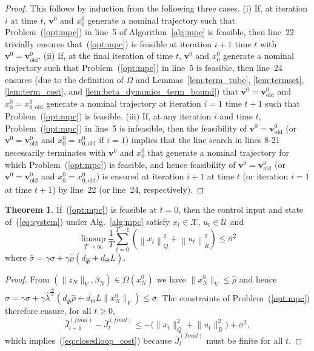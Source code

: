 \documentclass{IEEEtran}
\theoremstyle{definition}
\newtheorem{theorem}{Theorem}
\theoremstyle{remark}
\def\iter{i}
\begin{document}
\begin{proof}
This follows by induction from the following three cases. 
(i) If, at  iteration $\iter$ at time $t$, $\mathbf{v}^0$ and $x^0_0$ generate a nominal trajectory such that Problem~(\ref{opt:mpc}) in line~5 of Algorithm~\ref{alg:mpc} is feasible, then line~22 trivially ensures that~(\ref{opt:mpc}) is feasible at iteration $i+1$ time $t$ with $\mathbf{v}^0 = \mathbf{v}^0_{\mathrm{old}}$.
%
(ii) If, at the final iteration of time $t$, $\mathbf{v}^0$ and $x^0_0$ generate a nominal trajectory such that Problem~(\ref{opt:mpc}) in line~5 is feasible, then line~24 ensures 
(due to the definition of $\Omega$ and 
Lemmas~\ref{lem:term_tube}, \ref{lem:termset}, \ref{lem:term_cost}, and \ref{lem:beta_dynamics_term_bound})
that $\mathbf{v}^0=\mathbf{v}^0_{\mathrm{old}}$ and $x^0_0 = x^0_{0,\mathrm{old}}$ 
generate a nominal trajectory at iteration $i=1$ time $t+1$ such that Problem~(\ref{opt:mpc}) is feasible.
%
(iii) If, at any iteration $\iter$ and time $t$, Problem~(\ref{opt:mpc}) in line~5 is infeasible, then the feasibility of $\mathbf{v}^0 =\mathbf{v}^0_{\mathrm{old}}$ (or $\mathbf{v}^0 =\mathbf{v}^0_{\mathrm{old}}$ and $x^0_0=x^0_{0,\mathrm{old}}$ if $i=1$) implies that the line search in lines 8-21 necessarily terminates with $\mathbf{v}^0$ and $x^0_0$ that generate a nominal trajectory for which Problem~(\ref{opt:mpc}) is feasible, and hence feasibility of $\mathbf{v}^0 = \mathbf{v}^0_{\mathrm{old}}$ (or $\mathbf{v}^0 =\mathbf{v}^0_{\mathrm{old}}$ and $x^0_0=x^0_{0,\mathrm{old}}$) is ensured at iteration $i+1$ at time $t$ (or iteration $i=1$ at time $t+1$) by line~22 (or line~24, respectively).
\end{proof}

\begin{theorem}\label{thm:cost_bound}
If~(\ref{opt:mpc}) is feasible at $t=0$, then the control input and state of~(\ref{eq:system}) under Alg.~\ref{alg:mpc} satisfy $x_t\in \mathcal{X}$, $u_t\in\mathcal{U}$ and
\begin{equation}\label{eq:closedloop_cost}
\limsup_{T\rightarrow \infty} \frac{1}{T}\sum_{t=0}^{T-1} (\left\lVert x_t \right\rVert^2_Q +  \left\lVert u_t \right\rVert^2_R)\leq \bar{\sigma}^2 
\end{equation}
where $\bar{\sigma} = \gamma \sigma + 
\gamma \hat{\rho} (d_{\hat{\Phi}} + d_\Theta L)$.
\end{theorem}

\begin{proof}
From $(\|z_N\|_V,\beta_N)\in\Omega(x_N^0)$ we have $\|x_N^0\|_V \leq \hat{\rho}$ and hence   
$\hat{\sigma} = \gamma \sigma + \gamma\hat{\lambda}^{\frac{\hat{N}}{2}} (d_{\hat{\Phi}} \hat{\rho} + d_{\Theta}L\|x_N^0\|_V ) \leq \bar{\sigma}$.
The constraints of Problem~(\ref{opt:mpc}) therefore ensure, for all $t\geq 0$,
\begin{equation}\label{eq:cost_decrease}
\bar{J}^{(\mathit{final})}_{t+1} - \bar{J}^{(\mathit{final})}_{t} \leq -\bigl(\lVert x_{t} \rVert^2_Q +  \lVert u_{t} \rVert^2_R\bigr) + \bar{\sigma}^2 ,
\end{equation}
which implies~(\ref{eq:closedloop_cost}) because $\bar{J}^{(\mathit{final})}_{t}$ must be finite for all $t$.
\end{proof}
\end{document}
